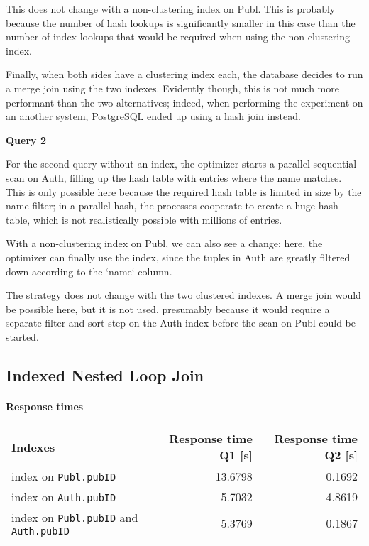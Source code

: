 \documentclass[11pt]{scrartcl}
\begin{document}
This does not change with a non-clustering index on Publ.  This is
probably because the number of hash lookups is significantly smaller in
this case than the number of index lookups that would be required when
using the non-clustering index.

Finally, when both sides have a clustering index each, the database
decides to run a merge join using the two indexes.  Evidently though,
this is not much more performant than the two alternatives; indeed, when
performing the experiment on an another system, PostgreSQL ended up
using a hash join instead.

\textbf{Query 2}

For the second query without an index, the optimizer starts a parallel
sequential scan on Auth, filling up the hash table with entries where
the name matches.  This is only possible here because the required hash
table is limited in size by the name filter; in a parallel hash, the
processes cooperate to create a huge hash table, which is not
realistically possible with millions of entries.

With a non-clustering index on Publ, we can also see a change: here,
the optimizer can finally use the index, since the tuples in Auth are
greatly filtered down according to the `name` column.

The strategy does not change with the two clustered indexes.  A merge
join would be possible here, but it is not used, presumably because it
would require a separate filter and sort step on the Auth index before
the scan on Publ could be started.

\subsection*{Indexed Nested Loop Join}

\paragraph{Response times}\mbox{}

\begin{table}[H]
  \centering
  \begin{tabular}{l|r|r}
    Indexes & Response time Q1 [s] & Response time Q2 [s] \tabularnewline
    \hline
    index on \texttt{Publ.pubID} & 13.6798 & 0.1692 \tabularnewline
    index on \texttt{Auth.pubID} & 5.7032 & 4.8619 \tabularnewline
    index on \texttt{Publ.pubID} and \texttt{Auth.pubID} & 5.3769 & 0.1867
        \tabularnewline
  \end{tabular}
\end{table}
\end{document}
